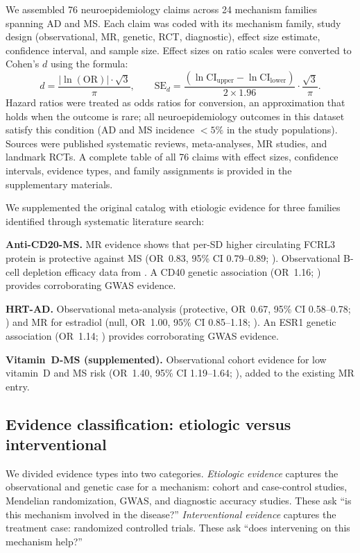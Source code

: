 \documentclass[11pt]{article}
\begin{document}
We assembled 76 neuroepidemiology claims across 24 mechanism families spanning AD and MS. Each claim was coded with its mechanism family, study design (observational, MR, genetic, RCT, diagnostic), effect size estimate, confidence interval, and sample size. Effect sizes on ratio scales were converted to Cohen's $d$ using the \citet{chinn2000} formula:
\begin{equation}
d = \frac{|\ln(\text{OR})| \cdot \sqrt{3}}{\pi}, \qquad
\text{SE}_d = \frac{(\ln\text{CI}_{\text{upper}} - \ln\text{CI}_{\text{lower}})}{2 \times 1.96} \cdot \frac{\sqrt{3}}{\pi}.
\label{eq:chinn}
\end{equation}
Hazard ratios were treated as odds ratios for conversion, an approximation that holds when the outcome is rare; all neuroepidemiology outcomes in this dataset satisfy this condition (AD and MS incidence $< 5\%$ in the study populations). Sources were published systematic reviews, meta-analyses, MR studies, and landmark RCTs. A complete table of all 76 claims with effect sizes, confidence intervals, evidence types, and family assignments is provided in the supplementary materials.

We supplemented the original catalog with etiologic evidence for three families identified through systematic literature search:

\textbf{Anti-CD20-MS.} MR evidence shows that per-SD higher circulating FCRL3 protein is protective against MS (OR~0.83, 95\% CI 0.79--0.89; \citealp{lin2023}). Observational B-cell depletion efficacy data from \citet{hu2019}. A CD40 genetic association (OR~1.16; \citealp{sokolova2013}) provides corroborating GWAS evidence.

\textbf{HRT-AD.} Observational meta-analysis (protective, OR~0.67, 95\% CI 0.58--0.78; \citealp{song2020}) and MR for estradiol (null, OR~1.00, 95\% CI 0.85--1.18; \citealp{barth2025}). An ESR1 genetic association (OR~1.14; \citealp{cheng2014}) provides corroborating GWAS evidence.

\textbf{Vitamin~D-MS (supplemented).} Observational cohort evidence for low vitamin~D and MS risk (OR~1.40, 95\% CI 1.19--1.64; \citealp{munger2006}), added to the existing MR entry.

\subsection{Evidence classification: etiologic versus interventional}

We divided evidence types into two categories. \emph{Etiologic evidence} captures the observational and genetic case for a mechanism: cohort and case-control studies, Mendelian randomization, GWAS, and diagnostic accuracy studies. These ask ``is this mechanism involved in the disease?'' \emph{Interventional evidence} captures the treatment case: randomized controlled trials. These ask ``does intervening on this mechanism help?''
\end{document}
